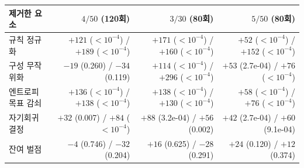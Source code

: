 \begin{tabular}{lrrr}
\toprule
제거한 요소 & $4/50$ (120회) & $3/30$ (80회) & $5/50$ (80회) \\
\midrule
규칙 정규화 & $+121$ ($<10^{-4}$) / $+189$ ($<10^{-4}$) & $+171$ ($<10^{-4}$) / $+160$ ($<10^{-4}$) & $+52$ ($<10^{-4}$) / $+152$ ($<10^{-4}$) \\
구성 무작위화 & $-19$ (0.260) / $-34$ (0.119) & $+114$ ($<10^{-4}$) / $+296$ ($<10^{-4}$) & $+53$ (2.7e-04) / $+76$ ($<10^{-4}$) \\
엔트로피 목표 감쇠 & $+136$ ($<10^{-4}$) / $+138$ ($<10^{-4}$) & $+138$ ($<10^{-4}$) / $+130$ ($<10^{-4}$) & $+58$ ($<10^{-4}$) / $+76$ ($<10^{-4}$) \\
자기회귀 결정 & $+32$ (0.007) / $+84$ ($<10^{-4}$) & $+88$ (3.2e-04) / $+56$ (0.002) & $+42$ (2.7e-04) / $+60$ (9.1e-04) \\
잔여 벌점 & $-4$ (0.746) / $-32$ (0.204) & $+16$ (0.625) / $-28$ (0.291) & $+24$ (0.120) / $+12$ (0.374) \\
\bottomrule
\end{tabular}%
